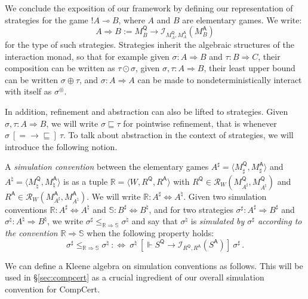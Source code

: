 \documentclass[acmsmall,timestamp,review,anonymous]{acmart}
\newcommand{\kw}[1]{\ensuremath{ \mathsf{#1} }}
\newcommand{\ifr}[1]{\ [{#1}]\ }
\begin{document}
We conclude the exposition of our framework
by defining our representation
of strategies for the game $!A \multimap B$,
where $A$ and $B$ are elementary games.
We write:
\[ A \Rightarrow B := M_B^\kw{Q} \rightarrow
   \mathcal{I}_{M_A^\kw{Q},M_A^\kw{A}}(M_B^\kw{A}) \]
for the type of such strategies.
Strategies inherit the algebraic structures
of the interaction monad,
so that for example
given $\sigma : A \Rightarrow B$ and $\tau : B \Rightarrow C$,
their composition can be written as $\tau \odot \sigma$,
given $\sigma, \tau : A \Rightarrow B$,
their least upper bound
can be written $\sigma \oplus \tau$,
and $\sigma : A \Rightarrow A$
can be made to nondeterministically interact with itself
as $\sigma^\circledcirc$.

In addition,
refinement and abstraction can also be lifted to strategies.
Given $\sigma, \tau : A \Rightarrow B$,
we will write $\sigma \sqsubseteq \tau$
for pointwise refinement,
that is whenever $\sigma \ifr{{=} \rightarrow {\sqsubseteq}} \tau$.
To talk about abstraction in the context of strategies,
we will introduce the following notion.

\begin{definition} %
A \emph{simulation convention} between the elementary games
$A^\sharp = \langle M_\sharp^\kw{Q}, M_\sharp^\kw{A} \rangle$ and
$A^\natural = \langle M_\natural^\kw{Q}, M_\natural^\kw{A} \rangle$
is as a tuple $\mathbb{R} = \langle W, R^\kw{Q}, R^\kw{A} \rangle$
with $R^\kw{Q} \in \mathcal{R}_W(M_{A^\sharp}^\kw{Q}, M_{A^\natural}^\kw{Q})$
and $R^\kw{A} \in \mathcal{R}_W(M_{A^\sharp}^\kw{A}, M_{A^\natural}^\kw{A})$.
We will write $\mathbb{R} : A^\sharp \Leftrightarrow A^\natural$.
Given two simulation conventions
$\mathbb{R} : A^\sharp \Leftrightarrow A^\natural$ and
$\mathbb{S} : B^\sharp \Leftrightarrow B^\natural$,
and for two strategies
$\sigma^\sharp : A^\sharp \Rightarrow B^\sharp$ and
$\sigma^\natural : A^\natural \Rightarrow B^\natural$,
we write $\sigma^\sharp \le_{\mathbb{R} \Rightarrow \mathbb{S}} \sigma^\natural$
and say that $\sigma^\natural$ is
\emph{simulated by $\sigma^\sharp$ according to the convention}
$\mathbb{R} \Rightarrow \mathbb{S}$
when the following property holds:
\[
  \sigma^\sharp \le_{\mathbb{R} \Rightarrow \mathbb{S}} \sigma^\natural
  \: :\Leftrightarrow \:
  \sigma^\natural
  \ifr{\Vdash S^\kw{Q} \rightarrow
       \mathcal{I}_{R^\kw{Q}, R^\kw{A}}(S^\kw{A})}
  \sigma^\sharp \,.
\]
\end{definition}

We can define a Kleene algebra on simulation conventions as follows.
This will be used in \S\ref{sec:compcert}
as a crucial ingredient of our overall simulation convention for CompCert.
\end{document}
